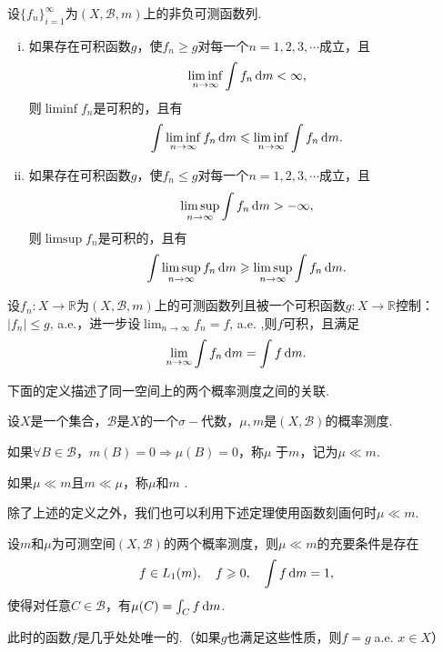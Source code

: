 \begin{lemma}[Fatou引理]
    设$\{f_n\}_{i=1}^\infty$为$(X,\mathcal{B},m)$上的非负可测函数列.
    \begin{enumerate}[(i)]
        \item 如果存在可积函数$g$，使$f_n \geqslant g$对每一个$n=1,2,3,\cdots$成立，且
        \[ \liminf_{n\to\infty}{\int{f_n}}\mathop{}\!\mathrm{d} m <\infty, \]
        则$\liminf{f_n}$是可积的，且有
        \[\int{\liminf_{n\to\infty}{f_n}\mathop{}\!\mathrm{d}m} \leqslant \liminf_{n\to\infty}{\int{f_n}\mathop{}\!\mathrm{d} m}. \]
        \item 如果存在可积函数$g$，使$f_n \leqslant g$对每一个$n=1,2,3,\cdots$成立，且
        \[ \limsup_{n\to\infty}{\int{f_n}}\mathop{}\!\mathrm{d} m > -\infty, \]
        则$\limsup{f_n}$是可积的，且有
        \[\int{\limsup_{n\to\infty}{f_n}\mathop{}\!\mathrm{d}m} \geqslant \limsup_{n\to\infty}{\int{f_n}\mathop{}\!\mathrm{d} m}. \]
    \end{enumerate}
\end{lemma}

\begin{theorem}
    设$f_n:X\to\mathbb{R}$为$(X,\mathcal{B},m)$上的可测函数列且被一个可积函数$g:X\to\mathbb{R}$控制：$|f_n| \leqslant g,\,$a.e.，进一步设$\lim_{n\to\infty}{f_n} = f,\,$a.e. ,则$f$可积，且满足
    \[\lim_{n\to\infty}{\int{f_n}\mathop{}\!\mathrm{d} m} = \int{f}\mathop{}\!\mathrm{d} m. \]
\end{theorem}

下面的定义描述了同一空间上的两个概率测度之间的关联.

\begin{definition}[绝对连续]
    设$X$是一个集合，$\mathcal{B}$是$X$的一个$\sigma-\!\!$代数，$\mu,m$是$(X,\mathcal{B})$的概率测度.\par
    如果$\forall B \in \mathcal{B}$，$m(B)=0 \Rightarrow \mu(B)=0$，称$\mu$ 于$m$，记为$\mu \ll m$.\par
    如果$\mu \ll m $且$m \ll \mu$，称$\mu$和$m$ .
\end{definition}

除了上述的定义之外，我们也可以利用下述定理使用函数刻画何时$\mu \ll m$.

\begin{theorem}
    \wideline
    设$m$和$\mu$为可测空间$(X,\mathcal{B})$的两个概率测度，则$\mu \ll m$的充要条件是存在
    \[f \in L_1(m),\quad f \geqslant 0,\quad \int{f}\mathop{}\!\mathrm{d} m =1, \]
    使得对任意$C\in\mathcal{B}$，有$\mu(C) = \int_C{f}\mathop{}\!\mathrm{d} m$.\par
    此时的函数$f$是几乎处处唯一的.（如果$g$也满足这些性质，则$f=g\;$a.e. $x\in X$）
\end{theorem}


